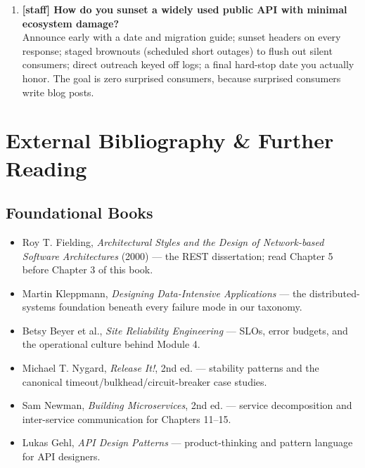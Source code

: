 \begin{enumerate}[label=\textbf{Q\arabic*.}, leftmargin=3.2em]
    Five-nines is 5.26 minutes of downtime \emph{per year}. Price it:
    multi-region active-active, chaos-tested failover, mature on-call,
    and accepting that any single dependency with a weaker SLO caps you.
    Show the marginal cost curve from 99.9 to 99.95 to 99.99 and let the
    business buy the point it needs --- per user journey, not uniformly.
  \item \textbf{[staff] How do you sunset a widely used public API with
    minimal ecosystem damage?}\\
    Announce early with a date and migration guide; sunset headers on
    every response; staged brownouts (scheduled short outages) to flush
    out silent consumers; direct outreach keyed off logs; a final
    hard-stop date you actually honor. The goal is zero surprised
    consumers, because surprised consumers write blog posts.
\end{enumerate}
\section{External Bibliography \& Further Reading}
\label{sec:ch0-reading}

\subsection{Foundational Books}
\begin{itemize}
  \item Roy T. Fielding, \emph{Architectural Styles and the Design of
    Network-based Software Architectures} (2000) \cite{fielding2000rest} ---
    the REST dissertation; read Chapter 5 before Chapter 3 of this book.
  \item Martin Kleppmann, \emph{Designing Data-Intensive Applications}
    \cite{kleppmann2017ddia} --- the distributed-systems foundation beneath
    every failure mode in our taxonomy.
  \item Betsy Beyer et al., \emph{Site Reliability Engineering}
  \cite{beyer2016sre} --- SLOs, error budgets, and the
    operational culture behind Module 4.
  \item Michael T. Nygard, \emph{Release It!}, 2nd ed.
    \cite{nygard2018releaseit} --- stability patterns and the canonical
    timeout/bulkhead/circuit-breaker case studies.
  \item Sam Newman, \emph{Building Microservices}, 2nd ed.
    \cite{newman2021microservices} --- service decomposition and
    inter-service communication for Chapters 11--15.
  \item Lukas Gehl, \emph{API Design Patterns} \cite{gehl2021apidesign} ---
    product-thinking and pattern language for API designers.
\end{itemize}


